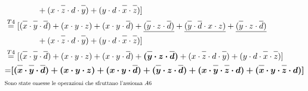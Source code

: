 \documentclass{article}
\newcommand*{\oline}[1]{\overline{#1\mathstrut}}
\newcommand{\bigspace}{\quad\quad\quad\quad}
\begin{document}
\begin{align*}
&\bigspace  + (x \cdot \oline{z} \cdot d \cdot \oline{y})+(y \cdot d \cdot \oline{x} \cdot \oline{z})] \\
&\overset{T4}{=} [(\oline{x} \cdot \oline{y} \cdot \oline{d}) + (x \cdot y \cdot z ) + (x \cdot y \cdot \oline{d}) + \underline{(\oline{y} \cdot z \cdot \oline{d})} + \underline{(\oline{y} \cdot \oline{d} \cdot x \cdot z)} + \underline{(\oline{y} \cdot z \cdot \oline{d} )} \\
&\bigspace  + (x \cdot \oline{z} \cdot d \cdot \oline{y})+(y \cdot d \cdot \oline{x} \cdot \oline{z})] \\
&\overset{T4}{=}  [(\oline{x} \cdot \oline{y} \cdot \oline{d}) + (x \cdot y \cdot z ) + (x \cdot y \cdot \oline{d}) + \bm{(\oline{y} \cdot z \cdot \oline{d})} +(x \cdot \oline{z} \cdot d \cdot \oline{y})+(y \cdot d \cdot \oline{x} \cdot \oline{z})] \\
&{=} \bm{[(\oline{x} \cdot \oline{y} \cdot \oline{d}) + (x \cdot y \cdot z ) + (x \cdot y \cdot \oline{d}) + (\oline{y} \cdot z \cdot \oline{d}) +(x \cdot \oline{y}  \cdot  \oline{z} \cdot d)+(\oline{x} \cdot y \cdot  \oline{z} \cdot d )] }\\
&\scalebox{0.7}{Sono state omesse le operazioni che sfruttano l'assioma $A6$}\
\end{align*}
\newpage
\end{document}
